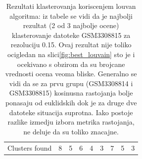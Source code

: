 \documentclass{article}
\begin{document}
\begin{table}[H]
{\begin{tabular}{lllllllll}
\multicolumn{1}{|l|}{Clusters found} & 8 & 5 & \multicolumn{1}{l|}{6} & \multicolumn{1}{l|}{\cellcolor[HTML]{67FD9A}4} & 3 & 7 & 5 & 3 \\ \cline{1-1} \cline{5-5}
\end{tabular}%
}
\caption{Rezultati klasterovanja koriscenjem louvan algoritma: iz tabele se vidi da je najbolji rezultat (2 od 3 najbolje ocene) klasterovanje datoteke GSM3308815 za rezoluciju 0.15. Ovaj rezultat nije toliko ocigledan na slici\ref{fig:best_louvain} sto je i ocekivano s obzirom da su brojcane vrednosti ocena veoma bliske. Generalno se vidi da se za prvu grupu (GSM3308814 i GSM3308815) kosinusna rastojanja bolje ponasaju od euklidskih dok je za druge dve datoteke situacija suprotna. Iako postoje razlike izmedju izbora metrika rastojanja, ne deluje da su toliko znacajne.  } \label{tab:louvain-results}
\end{table}
\end{document}
